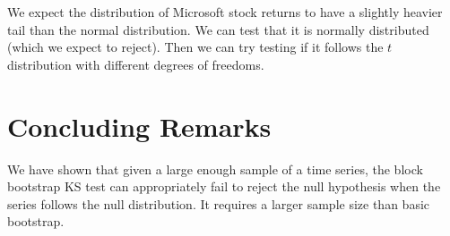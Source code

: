 \documentclass[12pt, letterpaper]{article}
\newcommand{\mc}[1]{\textcolor{green}{MC: (#1)}}
\begin{document}

We expect the distribution of Microsoft stock returns to have a slightly
heavier tail than the normal distribution. We can test that it is normally
distributed (which we expect to reject). Then we can try testing if it follows
the $t$ distribution with different degrees of freedoms.


\section{Concluding Remarks}
\label{sec:conclusion}

We have shown that given a large enough sample of a time series, the block 
bootstrap KS test can appropriately fail to reject the null hypothesis when the
series follows the null distribution. It requires a larger sample size than 
basic bootstrap.







\end{document}
